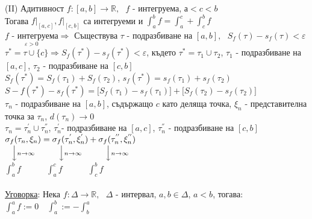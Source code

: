 \documentclass[12pt]{article}
\newcommand{\spc}{\text{ }}
\begin{document}
	$\spc$\\
	(II) Адитивност
	$f:[a,b]\rightarrow\mathbb{R},\spc f$ - интегруема, $а<c<b$\\
	Тогава $f\Big|_{[a,c]}, f\Big|_{[c,b]}$ са интегруеми и $\int_{a}^{b}f=\int_{a}^{c}+\int_{c}^{b}f$\\
	$\underset{\boxed{\varepsilon>0}}{f\text{ - интегруема}}\Rightarrow$ Съществува $\tau\text{ - подразбиване на }[a,b],\spc S_f(\tau)-s_f(\tau)<\varepsilon$\\
	$\tau^*=\tau\cup\{c\}\Rightarrow S_f(\tau^*)-s_f(\tau^*)<\varepsilon$, където $\tau^*=\tau_1\cup\tau_2$, $\tau_1$ - подразбиване на $[a,c]$, $\tau_2$ - подразбиване на $[c,b]$\\
	$S_f(\tau^*)=S_f(\tau_1)+S_f(\tau_2)$, $s_f(\tau^*)=s_f(\tau_1)+s_f(\tau_2)$\\
	$S-f(\tau^*)-s_f(\tau^*)=\Big[S_f(\tau_1)-s_f(\tau_1)\Big]+\Big[S_f(\tau_2)-s_f(\tau_2)\Big]$\\
	$\tau_n$ - подразбиване на $[a,b]$, съдържащо $c$ като деляща точка, $\xi_n$ - представителна точка за $\tau_n$, 
	$d(\tau_n)\longrightarrow0$\\
	$\tau_n=\tau_{n}^{'}\cup\tau_n^{''}$,
	$\tau_{n}^{'}$- подразбиване на $[a,c]$,
	$\tau_{n}^{''}$ - подразбиване на $[c,b]$\\
	$\underset{\Big\downarrow n\to\infty}{\sigma_f(\tau_n,\xi_n)}=
	\underset{\Big\downarrow n\to\infty}{\sigma_f(\tau_n^{'},\xi_n^{'})}+
	\underset{\Big\downarrow n\to\infty}{\sigma_f(\tau_n^{''},\xi_n^{''})}$\\
	$\int_{a}^{b}f\quad\quad\quad \int_{a}^{c}f\quad\quad\quad \int_{c}^{b}f$\\
	\\
	\underline{Уговорка}: Нека $f:\Delta\rightarrow\mathbb{R},\spc \Delta$ - интервал, $a,b\in\Delta$, $a<b$, тогава:\\
	$\int_{a}^{a}f:=0\quad \int_{a}^{b}:=-\int_{b}^{a}$
	
	
\end{document}

